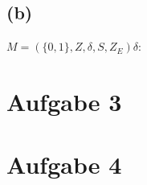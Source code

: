 \documentclass[titlepage]{article}
\renewcommand{\]}{\right]}
\renewcommand{\[}{\left[}
\renewcommand{\)}{\right)}
\renewcommand{\(}{\left(}
\renewcommand{\|}{\;|\;}
\begin{document}
	\subsection*{(b)}
		\tab$M=(\{0,1\},Z,\delta,S,Z_E)$\tab$\delta$:\\
		\begin{center}
			
			
		\end{center}
		
	
	\section*{Aufgabe 3}
		\begin{center}
			
			
			
		\end{center}
	
	\section*{Aufgabe 4}
		\begin{center}
			
		\end{center}

	\endgroup	
\end{document}
